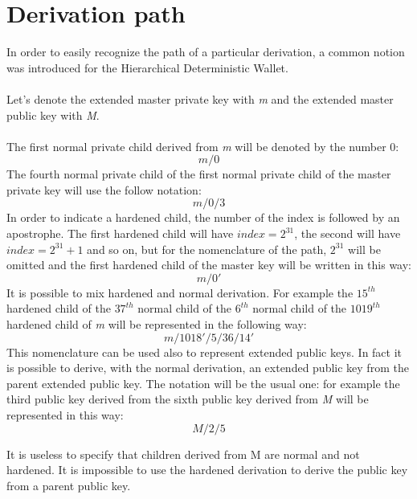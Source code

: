 \section{Derivation path}
In order to easily recognize the path of a particular derivation, a common notion was introduced for the Hierarchical Deterministic Wallet.
\\ \\
Let's denote the extended master private key with \textit{m} and the extended master public key with \textit{M}.
\\ \\
The first normal private child derived from \textit{m} will be denoted by the number $0$:
\begin{equation*}
m /0
\end{equation*}
The fourth normal private child of the first normal private child of the master private key will use the follow notation:
\begin{equation*}
m /0/3
\end{equation*}
In order to indicate a hardened child, the number of the index is followed by an apostrophe. The first hardened child will have $index=2^{31}$, the second will have $index=2^{31}+1$ and so on, but for the nomenclature of the path, $2^{31}$ will be omitted and the first hardened child of the master key will be written in this way: 
\begin{equation*}
m /0' 
\end{equation*}
It is possible to mix hardened and normal derivation. For example the $15^{th}$ hardened child of the $37^{th}$ normal child of the $6^{th}$ normal child of the $1019^{th}$ hardened child of \textit{m} will be represented in the following way:
\begin{equation*}
m /1018'/5/36/14'
\end{equation*}
This nomenclature can be used also to represent extended public keys. In fact it is possible to derive, with the normal derivation, an extended public key from the parent extended public key. The notation will be the usual one: for example the third public key derived from the sixth public key derived from \textit{M} will be represented in this way:
\begin{equation*}
M /2/5
\end{equation*}

\begin{remark}
It is useless to specify that children derived from M are normal and not hardened. It is impossible to use the hardened derivation to derive the public key from a parent public key.
\end{remark}

